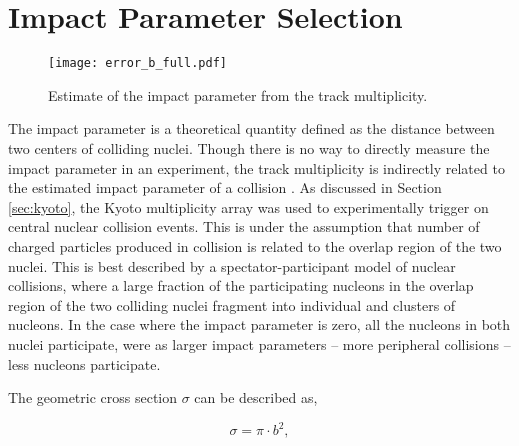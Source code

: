 \clearpage

\section{Impact Parameter Selection}

\begin{figure}[htb]
\centering
\texttt{[image: error\_b\_full.pdf]}
\caption{Estimate of the impact parameter from the track multiplicity.}
\label{fig:impactPar}
\end{figure}

The impact parameter is a theoretical quantity defined as the distance between two centers of colliding nuclei. Though there is no way to directly measure the impact parameter in an experiment, the track multiplicity is indirectly related to the estimated impact parameter of a collision \cite{impactpar}. As discussed in Section \ref{sec:kyoto}, the Kyoto multiplicity array was used to experimentally trigger on central nuclear collision events. This is under the assumption that number of charged particles produced in collision is related to the overlap region of the two nuclei. This is best described by a spectator-participant model of nuclear collisions, where a large fraction of the participating nucleons in the overlap region of the two colliding nuclei fragment into individual and clusters of nucleons. In the case where the impact parameter is zero, all the nucleons in both nuclei participate, were as larger impact parameters -- more peripheral collisions -- less nucleons participate. 



The geometric cross section $\sigma$ can be described as, 

\begin{equation}
\sigma = \pi \cdot b^2,
\label{eq:crossSect}
\end{equation}

